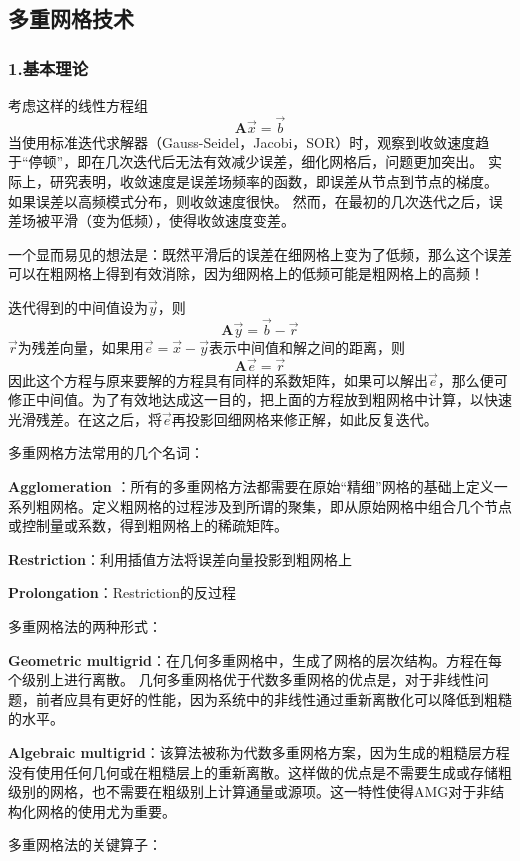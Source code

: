 \documentclass[10pt]{scrartcl}
\begin{document}
\subsection{多重网格技术}
\subsubsection{1.基本理论}

考虑这样的线性方程组
$$
\mathbf{A}\vec{x} = \vec{b}
$$
当使用标准迭代求解器（Gauss-Seidel，Jacobi，SOR）时，观察到收敛速度趋于“停顿”，即在几次迭代后无法有效减少误差，细化网格后，问题更加突出。 实际上，研究表明，收敛速度是误差场频率的函数，即误差从节点到节点的梯度。 如果误差以高频模式分布，则收敛速度很快。 然而，在最初的几次迭代之后，误差场被平滑（变为低频），使得收敛速度变差。

一个显而易见的想法是：既然平滑后的误差在细网格上变为了低频，那么这个误差可以在粗网格上得到有效消除，因为细网格上的低频可能是粗网格上的高频！

迭代得到的中间值设为$\vec{y}$，则
$$
\mathbf{A}\vec{y} = \vec{b} - \vec{r}
$$
$\vec{r}$为残差向量，如果用$\vec{e} = \vec{x} - \vec{y}$表示中间值和解之间的距离，则
$$
\mathbf{A}\vec{e} = \vec{r}
$$
因此这个方程与原来要解的方程具有同样的系数矩阵，如果可以解出$\vec{e}$，那么便可修正中间值。为了有效地达成这一目的，把上面的方程放到粗网格中计算，以快速光滑残差。在这之后，将$\vec{e}$再投影回细网格来修正解，如此反复迭代。

多重网格方法常用的几个名词：

 \textbf{Agglomeration} ：所有的多重网格方法都需要在原始“精细”网格的基础上定义一系列粗网格。定义粗网格的过程涉及到所谓的聚集，即从原始网格中组合几个节点或控制量或系数，得到粗网格上的稀疏矩阵。
 
\textbf{Restriction}：利用插值方法将误差向量投影到粗网格上

\textbf{Prolongation}：Restriction的反过程

多重网格法的两种形式：

\textbf{Geometric multigrid}：在几何多重网格中，生成了网格的层次结构。方程在每个级别上进行离散。 几何多重网格优于代数多重网格的优点是，对于非线性问题，前者应具有更好的性能，因为系统中的非线性通过重新离散化可以降低到粗糙的水平。

\textbf{Algebraic multigrid}：该算法被称为代数多重网格方案，因为生成的粗糙层方程没有使用任何几何或在粗糙层上的重新离散。这样做的优点是不需要生成或存储粗级别的网格，也不需要在粗级别上计算通量或源项。这一特性使得AMG对于非结构化网格的使用尤为重要。

多重网格法的关键算子：
\end{document}
